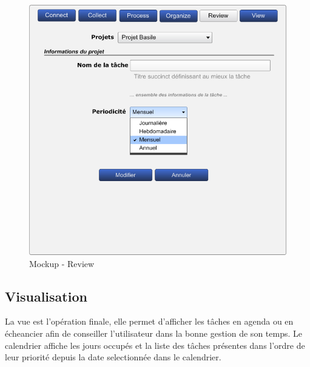 \begin{figure}[H]
  \begin{center}
  \includegraphics[scale=0.5]{diagrams/review.png}
  \caption{Mockup - Review}
  \end{center}
\end{figure}

\subsection{Visualisation}
La vue est l'opération finale, elle permet d'afficher les tâches en agenda ou
en écheancier afin de conseiller l'utilisateur dans la bonne gestion de son
temps. Le calendrier affiche les jours occupés et la liste des tâches présentes
dans l'ordre de leur priorité depuis la date selectionnée dans le
calendrier.

